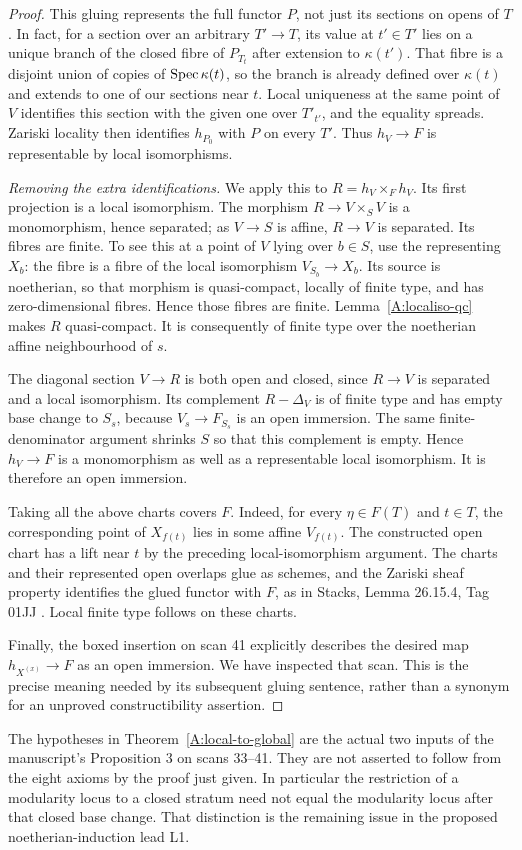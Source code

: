 \begin{proof}
This gluing represents the full functor $P$, not just its sections
on opens of $T$. In fact, for a section over an arbitrary
$T'\to T$, its value at $t'\in T'$ lies on a unique branch of the
closed fibre of $P_{T_t}$ after extension to $\kappa(t')$.
That fibre is a disjoint union of copies of $\operatorname{Spec}\kappa(t)$,
so the branch is already defined over $\kappa(t)$ and extends
to one of our sections near $t$. Local uniqueness at the same
point of $V$ identifies this section with the given one over
$T'_{t'}$, and the equality spreads. Zariski locality then
identifies $h_{P_0}$ with $P$ on every $T'$. Thus $h_V\to F$
is representable by local isomorphisms.

\emph{Removing the extra identifications.} We apply this to
$R=h_V\times_F h_V$. Its first projection is a local isomorphism.
The morphism $R\to V\times_S V$ is a monomorphism, hence separated;
as $V\to S$ is affine, $R\to V$ is separated. Its fibres are
finite. To see this at a point of $V$ lying over $b\in S$, use
the representing $X_b$: the fibre is a fibre of the local
isomorphism $V_{S_b}\to X_b$. Its source is noetherian, so that
morphism is quasi-compact, locally of finite type, and has
zero-dimensional fibres. Hence those fibres are finite.
Lemma~\ref{A:localiso-qc} makes $R$ quasi-compact. It is consequently
of finite type over the noetherian affine neighbourhood of $s$.

The diagonal section $V\to R$ is both open and closed, since
$R\to V$ is separated and a local isomorphism. Its complement
$R-\Delta_V$ is of finite type and has empty base change to
$S_s$, because $V_s\to F_{S_s}$ is an open immersion. The same
finite-denominator argument shrinks $S$ so that this complement
is empty. Hence $h_V\to F$ is a monomorphism as well as a
representable local isomorphism. It is therefore an open immersion.

Taking all the above charts covers $F$. Indeed, for every
$\eta\in F(T)$ and $t\in T$, the corresponding point of $X_{f(t)}$
lies in some affine $V_{f(t)}$. The constructed open chart has a
lift near $t$ by the preceding local-isomorphism argument. The
charts and their represented open overlaps glue as schemes, and
the Zariski sheaf property identifies the glued functor with $F$,
as in Stacks, Lemma 26.15.4, Tag 01JJ \cite{Stacks01JJ}.
Local finite type follows on these charts.

Finally, the boxed insertion on scan 41 explicitly describes
the desired map $h_{X^{(x)}}\to F$ as an open immersion. We have
inspected that scan. This is the precise meaning needed by its
subsequent gluing sentence, rather than a synonym for an
unproved constructibility assertion.
\end{proof}

The hypotheses in Theorem~\ref{A:local-to-global} are the actual
two inputs of the manuscript's Proposition 3 on scans 33--41.
They are not asserted to follow from the eight axioms by the
proof just given. In particular the restriction of a modularity
locus to a closed stratum need not equal the modularity locus
after that closed base change. That distinction is the remaining
issue in the proposed noetherian-induction lead L1.
